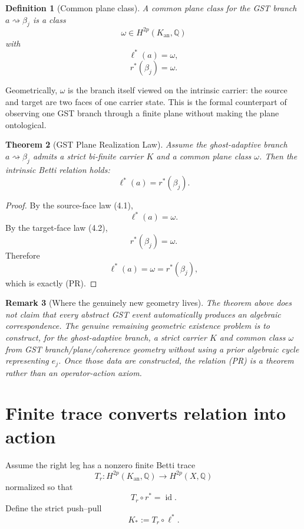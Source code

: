 \documentclass[11pt]{article}
\newtheorem{definition}{Definition}[section]
\newtheorem{theorem}[definition]{Theorem}
\newtheorem{remark}[definition]{Remark}
\newcommand{\Q}{\mathbb{Q}}
\begin{document}
\begin{definition}[Common plane class]
A \emph{common plane class} for the GST branch
$a\rightsquigarrow\beta_j$ is a class
\[
  \omega\in H^{2p}(K_{\mathrm{an}},\Q)
\]
with
\[
  \ell^*(a)=\omega, \tag{4.1}
\]
\[
  r^*(\beta_j)=\omega. \tag{4.2}
\]
\end{definition}

Geometrically, $\omega$ is the branch itself viewed on the intrinsic carrier:
the source and target are two faces of one carrier state.  This is the formal
counterpart of observing one GST branch through a finite plane without making
the plane ontological.

\begin{theorem}[GST Plane Realization Law]
Assume the ghost-adaptive branch $a\rightsquigarrow\beta_j$ admits a strict
bi-finite carrier $K$ and a common plane class $\omega$.  Then the intrinsic
Betti relation holds:
\[
  \ell^*(a)=r^*(\beta_j). \tag{PR}
\]
\end{theorem}

\begin{proof}
By the source-face law (4.1),
\[
  \ell^*(a)=\omega.
\]
By the target-face law (4.2),
\[
  r^*(\beta_j)=\omega.
\]
Therefore
\[
  \ell^*(a)=\omega=r^*(\beta_j),
\]
which is exactly (PR).
\end{proof}

\begin{remark}[Where the genuinely new geometry lives]
The theorem above does not claim that every abstract GST event automatically
produces an algebraic correspondence.  The genuine remaining geometric
existence problem is to construct, for the ghost-adaptive branch, a strict
carrier $K$ and common class $\omega$ from GST branch/plane/coherence geometry
without using a prior algebraic cycle representing $e_j$.  Once those data are
constructed, the relation (PR) is a theorem rather than an operator-action
axiom.
\end{remark}

\section{Finite trace converts relation into action}

Assume the right leg has a nonzero finite Betti trace
\[
  T_r:H^{2p}(K_{\mathrm{an}},\Q)\longrightarrow H^{2p}(X,\Q)
\]
normalized so that
\[
  T_r\circ r^*=\operatorname{id}. \tag{5.1}
\]
Define the strict push--pull
\[
  K_*:=T_r\circ\ell^*.
\]
\end{document}
